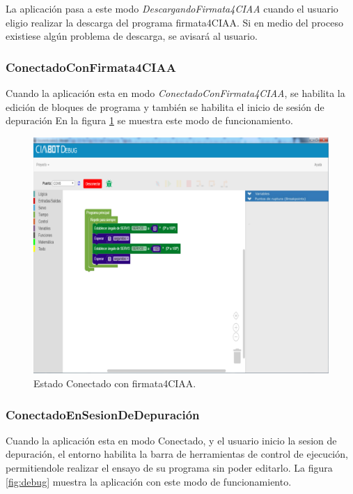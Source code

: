 La aplicación pasa a este modo \emph{DescargandoFirmata4CIAA} cuando el usuario eligio realizar la descarga del programa firmata4CIAA. Si en medio del proceso existiese algún problema de descarga, se avisará al usuario.

\subsubsection{ConectadoConFirmata4CIAA}
\label{subsubsec:ConectadoConFirmata4CIAA}

Cuando la aplicación esta en modo \emph{ConectadoConFirmata4CIAA}, se habilita la edición de bloques de programa y también se habilita el inicio de sesión de depuración
En la figura \ref{fig:conectado} se muestra este modo de funcionamiento.


\begin{figure}[!htbp]
	\begin{center}  %
		\includegraphics[scale=.35]{./Figures/debug-conectado.png}
		\par\caption{Estado Conectado con firmata4CIAA.}\label{fig:conectado}
	\end{center}
\end{figure}

\subsubsection{ConectadoEnSesionDeDepuración}
\label{subsubsec:ConectadoEnSesionDeDepuración}

Cuando la aplicación esta en modo Conectado, y el usuario inicio la sesion de depuración, el entorno habilita la barra de herramientas de control de ejecución, permitiendole realizar el ensayo de su programa sin poder editarlo. La figura \ref{fig:debug} muestra la aplicación con este modo de funcionamiento.

